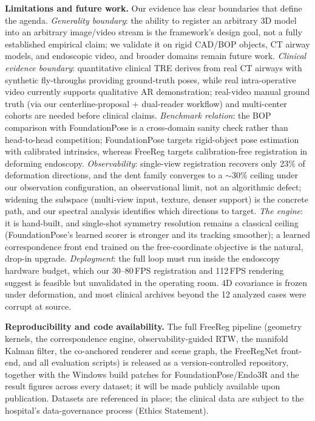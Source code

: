 \documentclass[9pt,twoside,web]{ieeecolor2}
\begin{document}
\textbf{Limitations and future work.} Our evidence has clear boundaries that define the agenda. \emph{Generality boundary}: the ability to register an arbitrary 3D model into an arbitrary image/video stream is the framework's design goal, not a fully established empirical claim; we validate it on rigid CAD/BOP objects, CT airway models, and endoscopic video, and broader domains remain future work. \emph{Clinical evidence boundary}: quantitative clinical TRE derives from real CT airways with synthetic fly-throughs providing ground-truth poses, while real intra-operative video currently supports qualitative AR demonstration; real-video manual ground truth (via our centerline-proposal + dual-reader workflow) and multi-center cohorts are needed before clinical claims. \emph{Benchmark relation}: the BOP comparison with FoundationPose is a cross-domain sanity check rather than head-to-head competition; FoundationPose targets rigid-object pose estimation with calibrated intrinsics, whereas FreeReg targets calibration-free registration in deforming endoscopy. \emph{Observability}: single-view registration recovers only 23\% of deformation directions, and the dent family converges to a $\sim$30\% ceiling under our observation configuration, an observational limit, not an algorithmic defect; widening the subspace (multi-view input, texture, denser support) is the concrete path, and our spectral analysis identifies which directions to target. \emph{The engine}: it is hand-built, and single-shot symmetry resolution remains a classical ceiling (FoundationPose's learned scorer is stronger and its tracking smoother); a learned correspondence front end trained on the free-coordinate objective is the natural, drop-in upgrade. \emph{Deployment}: the full loop must run inside the endoscopy hardware budget, which our 30--80\,FPS registration and 112\,FPS rendering suggest is feasible but unvalidated in the operating room. 4D covariance is frozen under deformation, and most clinical archives beyond the 12 analyzed cases were corrupt at source.

\textbf{Reproducibility and code availability.} The full FreeReg pipeline (geometry kernels, the correspondence engine, observability-guided RTW, the manifold Kalman filter, the co-anchored renderer and scene graph, the FreeRegNet front-end, and all evaluation scripts) is released as a version-controlled repository, together with the Windows build patches for FoundationPose/Endo3R and the result figures across every dataset; it will be made publicly available upon publication. Datasets are referenced in place; the clinical data are subject to the hospital's data-governance process (Ethics Statement).
\end{document}
